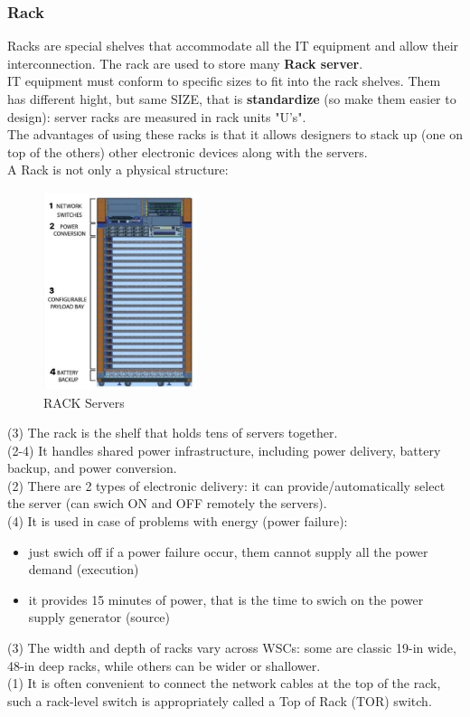 \documentclass[10pt, oneside]{article}
\begin{document}
\subsubsection{Rack}
Racks are special shelves that accommodate all the IT equipment and allow their interconnection. The rack are used to store many {\bf Rack server}.\\ 
IT equipment must conform to specific sizes to fit into the rack shelves. Them has different hight, but same SIZE, that is {\bf standardize} (so make them easier to design): server racks are measured in rack units "U's".\\ The advantages of using these racks is that it allows designers to stack up (one on top of the others) other electronic devices along with the servers.\\
\newline
A Rack is not only a physical structure:
\begin{multicols}{2}
\noindent
\begin{figure}[H]
    \begin{center}
    \includegraphics[width=0.4\textwidth]{img/img8.jpeg}
    \caption{RACK Servers}
    \label{fig:RACK servers}
    \end{center}
\end{figure}
\columnbreak
\noindent
(3) The rack is the shelf that holds tens of servers together. \\(2-4) It handles shared power infrastructure, including power delivery, battery backup, and power conversion.\\
(2) There are 2 types of electronic delivery: it can provide/automatically select the server (can swich ON and OFF remotely the servers).\\
(4) It is used in case of problems with energy (power failure):
\begin{itemize}
    \item just swich off if a power failure occur, them cannot supply all the power demand (execution)
    \item it provides 15 minutes of power, that is the time to swich on the power supply generator (source) 
\end{itemize}
(3) The width and depth of racks vary across WSCs: some are classic 19-in wide, 48-in deep racks, while others can be wider or shallower.\\ 
(1) It is often convenient to connect the network cables at the top of the rack, such a rack-level switch is appropriately called a Top of Rack (TOR) switch.
\end{multicols}
\end{document}
